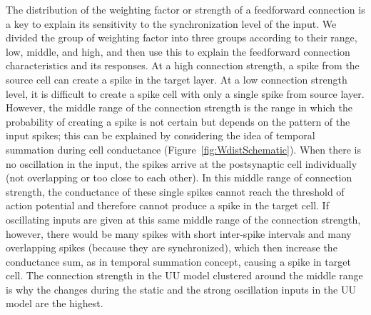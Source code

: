 The distribution of the weighting factor or strength of a feedforward connection is a key to explain its sensitivity to the synchronization level of the input. We divided the group of weighting factor into three groups according to their range, low, middle, and high, and then use this to explain the feedforward connection characteristics and its responses. At a high connection strength, a spike from the source cell can create a spike in the target layer. At a low connection strength level, it is difficult to create a spike cell with only a single spike from source layer. However, the middle range of the connection strength is the range in which the probability of creating a spike is not certain but depends on the pattern of the input spikes; this can be explained by considering the idea of temporal summation during cell conductance (Figure~\ref{fig:WdistSchematic}). When there is no oscillation in the input, the spikes arrive at the postsynaptic cell individually (not overlapping or too close to each other). In this middle range of connection strength, the conductance of these single spikes cannot reach the threshold of action potential and therefore cannot produce a spike in the target cell. If oscillating inputs are given at this same middle range of the connection strength, however, there would be many spikes with short inter-spike intervals and many overlapping spikes (because they are synchronized), which then increase the conductance sum, as in temporal summation concept, causing a spike in target cell. The connection strength in the UU model clustered around the middle range is why the changes during the static and the strong oscillation inputs in the UU model are the highest. 




%
%
%

